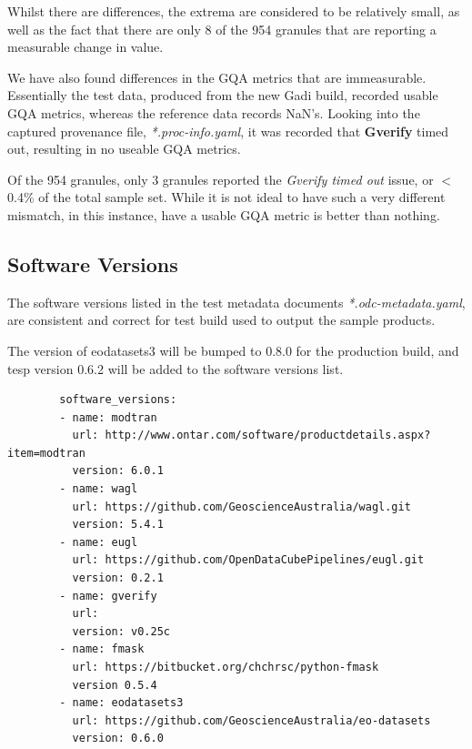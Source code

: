 \documentclass[a4paper]{article}
\begin{document}
      \begin{flushleft}
        Whilst there are differences, the extrema are considered to be relatively small, as well as the fact that there are only 8 of the 954 granules that are reporting a measurable change in value. \par
        We have also found differences in the GQA metrics that are immeasurable. Essentially the test data, produced from the new Gadi build, recorded usable GQA metrics, whereas the reference data records NaN's. Looking into the captured provenance file, \textit{*.proc-info.yaml}, it was recorded that \textbf{Gverify} timed out, resulting in no useable GQA metrics. \par
        Of the 954 granules, only 3 granules reported the \textit{Gverify timed out} issue, or $<$ 0.4\% of the total sample set. While it is not ideal to have such a very different mismatch, in this instance, have a usable GQA metric is better than nothing.
      \end{flushleft}

    \subsection{Software Versions}

      \begin{flushleft}
        The software versions listed in the test metadata documents \textit{*.odc-metadata.yaml}, are consistent and correct for test build used to output the sample products. \par
        The version of eodatasets3 will be bumped to 0.8.0 for the production build, and tesp version 0.6.2 will be added to the software versions list.
      \end{flushleft}

      \begin{lstlisting}
        software_versions:
        - name: modtran
          url: http://www.ontar.com/software/productdetails.aspx?item=modtran
          version: 6.0.1
        - name: wagl
          url: https://github.com/GeoscienceAustralia/wagl.git
          version: 5.4.1
        - name: eugl
          url: https://github.com/OpenDataCubePipelines/eugl.git
          version: 0.2.1
        - name: gverify
          url:
          version: v0.25c
        - name: fmask
          url: https://bitbucket.org/chchrsc/python-fmask
          version 0.5.4
        - name: eodatasets3
          url: https://github.com/GeoscienceAustralia/eo-datasets
          version: 0.6.0
      \end{lstlisting}
\end{document}
